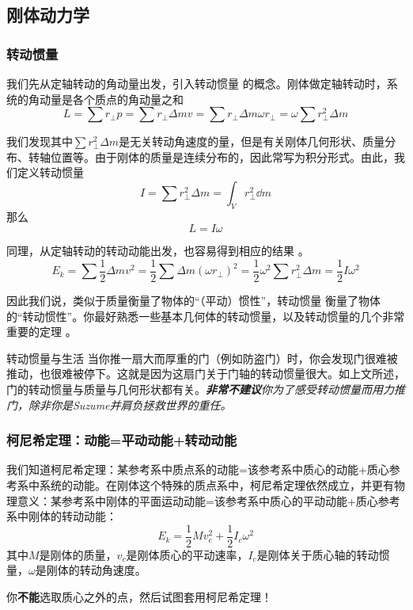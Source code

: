 \subsection{刚体动力学}
\subsubsection{转动惯量}
我们先从定轴转动的角动量出发，引入转动惯量 的概念。刚体做定轴转动时，系统的角动量是各个质点的角动量之和
$$L = \sum r_\perp p = \sum r_\perp \Delta m v = \sum r_\perp \Delta m \omega r_\perp = \omega \sum r_\perp^2 \Delta m$$

我们发现其中$\sum r_\perp^2 \Delta m$是无关转动角速度的量，但是有关刚体几何形状、质量分布、转轴位置等。由于刚体的质量是连续分布的，因此常写为积分形式。由此，我们定义转动惯量
$$
I =\sum r_\perp^2 \Delta m = \int_V r_\perp^2 \dd m
$$
那么
$$ L = I \omega$$

同理，从定轴转动的转动动能出发，也容易得到相应的结果 。
$$E_k = \sum \frac{1}{2} \Delta m v^2 = \frac{1}{2} \sum \Delta m (\omega r_\perp)^2 = \frac{1}{2} \omega^2 \sum r_\perp^2 \Delta m = \frac{1}{2} I \omega^2$$

因此我们说，类似于质量衡量了物体的“（平动）惯性”，转动惯量 衡量了物体的“转动惯性”。你最好熟悉一些基本几何体的转动惯量，以及转动惯量的几个非常重要的定理 。

\begin{example}{转动惯量与生活}
当你推一扇大而厚重的门（例如防盗门）时，你会发现门很难被推动，也很难被停下。这就是因为这扇门关于门轴的转动惯量很大。如上文所述，门的转动惯量与质量与几何形状都有关。\textsl{\textbf{非常不建议}你为了感受转动惯量而用力推门，除非你是Suzume并肩负拯救世界的重任。}
\end{example}

\subsubsection{柯尼希定理：动能=平动动能+转动动能}
我们知道柯尼希定理：某参考系中质点系的动能=该参考系中质心的动能+质心参考系中系统的动能。在刚体这个特殊的质点系中，柯尼希定理依然成立，并更有物理意义：某参考系中刚体的平面运动动能=该参考系中质心的平动动能+质心参考系中刚体的转动动能：
$$E_k = \frac{1}{2}Mv_c^2 + \frac{1}{2} I_c \omega^2$$
其中$M$是刚体的质量，$v_c$是刚体质心的平动速率，$I_c$是刚体关于质心轴的转动惯量，$\omega$是刚体的转动角速度。

你\textbf{不能}选取质心之外的点，然后试图套用柯尼希定理！


